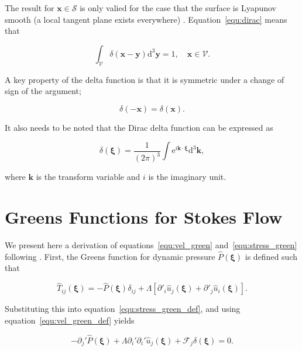 \documentclass[12pt]{article}
\begin{document}
The result for $\boldsymbol{x} \in \mathcal{S}$ is only valied for the case that the surface is Lyapunov smooth (a local tangent plane exists everywhere) \citep{Gunter67}. Equation~\ref{equ:dirac} means that

\begin{equation}
\label{equ:delta_int}
\int_{\mathcal{V}} \delta(\boldsymbol{x} - \boldsymbol{y}) \mathrm{d}^{3} \boldsymbol{y} = 1, \quad \boldsymbol{x} \in \mathcal{V}.
\end{equation}

A key property of the delta function is that it is symmetric under a change of sign of the argument;

\begin{equation}
\label{equ:delta_sym}
\delta(-\boldsymbol{x}) = \delta(\boldsymbol{x}).
\end{equation}

It also needs to be noted that the Dirac delta function can be expressed as \citep{Riley06}

\begin{equation}
\label{equ:delta_int_def}
\delta (\boldsymbol{\xi}) = \frac{1}{(2 \pi)^{3}} \int \mathrm{e}^{i \boldsymbol{k} \cdot \boldsymbol{\xi}} \mathrm{d}^{3} \boldsymbol{k},
\end{equation}

where $\boldsymbol{k}$ is the transform variable and $i$ is the imaginary unit.

\section{Greens Functions for Stokes Flow}
\label{app:Greens}

We present here a derivation of equations~\ref{equ:vel_green} and~\ref{equ:stress_green} following \citet{Ladyzhenskaya63}. First, the Greens function for dynamic pressure $\hat{P}(\boldsymbol{\xi})$ is defined such that

\begin{equation}
\label{equ:press_green_def}
\hat{T}_{ij}(\boldsymbol{\xi}) = - \hat{P}(\boldsymbol{\xi}) \delta_{ij} + \Lambda[\partial'_{i} \hat{u}_{j}(\boldsymbol{\xi}) + \partial'_{j} \hat{u}_{i}(\boldsymbol{\xi})] .
\end{equation}


Substituting this into equation~\ref{equ:stress_green_def}, and using equation~\ref{equ:vel_green_def} yields 

\begin{equation}
\label{equ:stokes_green}
-\partial_{j}' \hat{P}(\boldsymbol{\xi}) + \Lambda \partial_{i}' \partial_{i}' \hat{u}_{j}(\boldsymbol{\xi}) + \mathcal{F}_{j} \delta(\boldsymbol{\xi}) = 0 .
\end{equation}
\end{document}
